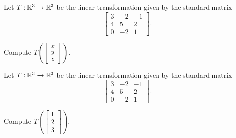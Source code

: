 \begin{applicationActivities}
\begin{activity}{5}
  Let $T: \mathbb{R}^3 \rightarrow \mathbb{R}^3$ be the linear transformation given by the standard matrix
  \[
    \begin{bmatrix} 3  & -2 & -1  \\ 4 & 5 & 2 \\ 0 & -2 & 1 \end{bmatrix}
  .\]

Compute $T\left(\begin{bmatrix} x\\ y \\ z \end{bmatrix} \right) $.
\end{activity}

\begin{activity}{5}
  Let $T: \mathbb{R}^3 \rightarrow \mathbb{R}^3$ be the linear transformation given by the standard matrix
  \[
    \begin{bmatrix} 3  & -2 & -1  \\ 4 & 5 & 2 \\ 0 & -2 & 1 \end{bmatrix}
  .\]

Compute $T\left(\begin{bmatrix} 1\\ 2 \\ 3 \end{bmatrix} \right) $.
\end{activity}


\end{applicationActivities}
